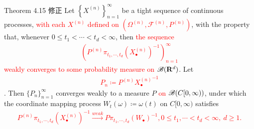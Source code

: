 	\begin{itembox}[l]{Theorem 4.15 修正}
		Let $\left\{X^{(n)}\right\}_{n=1}^\infty$ be a tight sequence of continuous processes,
		\textcolor{red}{with each $X^{(n)}$ defined on $\left(\Omega^{(n)},\mathscr{F}^{(n)},P^{(n)}\right)$},
		with the property that, whenever $0 \leq t_1 < \cdots < t_d < \infty$, then
		\textcolor{red}{the sequence
		\begin{align}
			\left( P^{(n)}\pi_{t_1,\cdots,t_d}(X_\bullet^{(n)})^{-1} \right)_{n=1}^\infty
		\end{align}
		weakly converges to some probability measure on $\mathscr{B}(\mathbf{R}^d)$}.
		Let \textcolor{red}{
		\begin{align}
			P_n \coloneqq P^{(n)} {X_\bullet^{(n)}}^{-1}
		\end{align}
		}. Then $\{P_n\}_{n=1}^\infty$ converges weakly to a measure $P$
		\textcolor{red}{on $\mathscr{B}(C[0,\infty))$}, under which the coordinate mapping process
		$W_t(\omega) \coloneqq \omega(t)$ on $C[0,\infty)$ satisfies
		\textcolor{red}{
		\begin{align}
			P^{(n)}\pi_{t_1,\cdots,t_d}(X_\bullet^{(n)})^{-1}
			\overset{weak}{\longrightarrow} P\pi_{t_1,\cdots,t_d}(W_\bullet)^{-1},
			0 \leq t_1, \cdots < t_d < \infty,\ d \geq 1.
			\label{eq:chapter_2_Theorem_4_15_6}
		\end{align}
		}
	\end{itembox}
	
